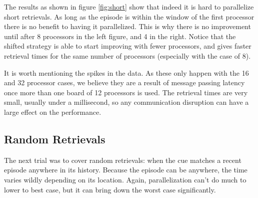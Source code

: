 \documentclass[11pt]{article} %
\begin{document}
The results as shown in figure \ref{fig:short} show that indeed it is hard to parallelize short retrievals. As long as the episode is within the window 
of the first processor there is no benefit to having it parallelized. This is why there is no improvement until after 8 processors in the left figure, 
and 4 in the right. Notice that the shifted strategy is able to start improving with fewer processors, 
and gives faster retrieval times for the same number of processors (especially with the case of 8). 

It is worth mentioning the spikes in the data. As these only happen with the 16 and 32 processor cases, we believe they are a result of 
message passing latency once more than one board of 12 processors is used. The retrieval times are very small, usually under a millisecond, 
so any communication disruption can have a large effect on the performance. 

\subsection{Random Retrievals}
The next trial was to cover random retrievals: when the cue matches a recent episode anywhere in its history.
Because the episode can be anywhere, the time varies wildly depending on its location. Again, 
parallelization can't do much to lower to best case, but it can bring down the worst case significantly.   
\end{document}

